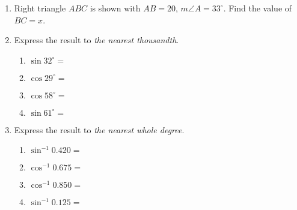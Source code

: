 \documentclass[12pt, twoside]{article}
\begin{document}
\begin{enumerate}
\item Right triangle $ABC$ is shown with $AB=20$, $m\angle A=33^\circ$. Find the value of $BC=x$.
  \begin{flushright}
  \end{flushright} \vspace{1.5cm}

\item Express the result to \emph{the nearest thousandth}.  \vspace{0.5cm}
\begin{multicols}{2}
  \begin{enumerate}
    \item $\sin 32^\circ = $ \vspace{1cm}
    \item $\cos 29^\circ =$
    \item $\cos 58^\circ = $ \vspace{1cm}
    \item $\sin 61^\circ =$
  \end{enumerate}
\end{multicols} \vspace{0.5cm}

\item Express the result to \emph{the nearest whole degree}.  \vspace{0.5cm}
\begin{multicols}{2}
  \begin{enumerate}
    \item $\sin^{-1} 0.420 = $ \vspace{1cm}
    \item $\cos^{-1} 0.675 =$
    \item $\cos^{-1} 0.850 = $ \vspace{1cm}
    \item $\sin^{-1} 0.125 =$
  \end{enumerate}
\end{multicols}

\end{enumerate}
\end{document}
